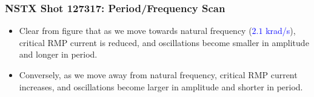 \documentclass{beamer}
\newcommand{\blue}[1]{\textcolor{blue}{#1}}
\begin{document}
\begin{frame}
\frametitle{NSTX Shot 127317: Period/Frequency Scan}
\begin{itemize}
\item Clear from figure that as we move towards natural frequency (\blue{$2.1$ krad/s}), critical RMP current
is reduced, and oscillations become smaller in amplitude and longer in period.
\item Conversely, as we move away from  natural frequency, critical RMP current
increases, and oscillations become larger in amplitude and shorter in period.

\end{itemize}
\end{frame}
\end{document}
